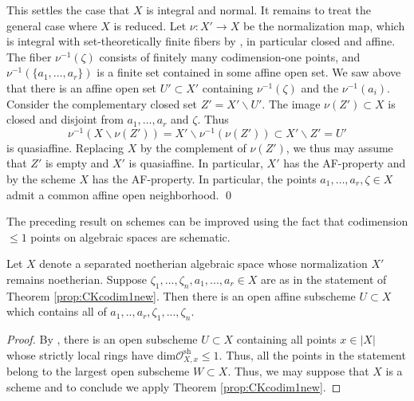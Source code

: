 \documentclass[12pt]{amsart}
\newcommand{\ra}{\rightarrow}
\begin{document}
This settles the case that $X$ is integral and normal. It remains to treat the general case where $X$ is reduced.
Let $\nu:X'\ra X$ be the normalization map, which is integral with set-theoretically finite fibers by \cite[Prop. 4.8.2]{MR2266432}, in particular closed and affine. 
The fiber $\nu^{-1}(\zeta)$ consists of finitely many codimension-one points,
and $ \nu^{-1}(\{a_1,\ldots, a_r\})$ is a finite set contained in some affine open set.
We saw above that there is an affine open set $U'\subset X'$ containing $\nu^{-1}(\zeta)$ and the $\nu^{-1}(a_i)$.
Consider the complementary closed set $Z'=X'\smallsetminus U'$.
The image $\nu(Z')\subset X$ is closed and disjoint from $a_1,\ldots,a_r$ and $\zeta$.
Thus 
$$
\nu^{-1}(X\smallsetminus \nu(Z')) = X'\smallsetminus \nu^{-1}(\nu(Z')) \subset X'\smallsetminus Z'=U'
$$
is quasiaffine. 
Replacing $X$ by the complement of $\nu(Z')$, we thus may assume that $Z'$ is empty and $X'$ is quasiaffine.
In particular, $X'$ has the AF-property and by \cite[Thm. 3.3]{SurfaceRes} the scheme $X$ has the AF-property.
In particular, the points $a_1,\ldots,a_r,\zeta\in X$ admit a common affine open neighborhood. \qed

\medskip

The preceding result on schemes can be improved using the fact that codimension $\leq 1$ points on algebraic spaces are schematic. 

\begin{corollary} \label{cor:codim1}  Let $X$ denote a separated noetherian algebraic space whose normalization $X'$ remains noetherian. Suppose $\zeta_1,...,\zeta_n, a_1,...,a_r \in X$ are as in the statement of Theorem \ref{prop:CKcodim1new}. Then there is an open affine subscheme $U \subset X$ which contains all of $a_1,..,a_r,\zeta_1,...,\zeta_n$.
\end{corollary}

\begin{proof} By \cite[Tag 0ADD]{stacks}, there is an open subscheme $U \subset X$ containing all points $x \in |X|$ whose strictly local rings have $\text{dim} \mathcal{O}^{\text{sh}}_{X,x} \leq 1$. Thus, all the points in the statement belong to the largest open subscheme $W \subset X$. Thus, we may suppose that $X$ is a scheme and to conclude we apply Theorem \ref{prop:CKcodim1new}. \end{proof}
\end{document}
